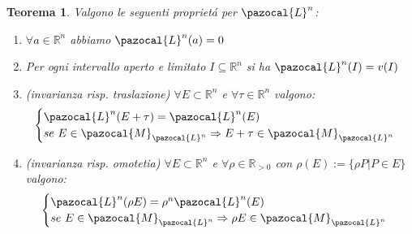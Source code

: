 \documentclass[11pt,a4paper]{report}
\theoremstyle{plain}
\newtheorem{thm}{Teorema}[chapter] %
\theoremstyle{definition}
\newcommand{\Le}{\pazocal{L}}
\newcommand{\Ml}{\pazocal{M}_{\Le^n}}
\begin{document}
\begin{thm}
	Valgono le seguenti propriet\'a per $\Le^n$:
	\begin{enumerate}
		\item $\forall a \in \mathbb{R}^n$ abbiamo $\Le^n(a) = 0$
		\item Per ogni intervallo aperto e limitato $I \subseteq \mathbb{R}^n$ si ha  $\Le^n(I) = v(I)$
		\item (invarianza risp. traslazione) $\forall E \subset \mathbb{R}^n$ e $\forall \tau \in \mathbb{R}^n$ valgono:
		\[
			\begin{cases}
				\Le^n(E+\tau) = \Le^n(E)\\
				se\ E \in \Ml \Rightarrow E+\tau \in \Ml
			\end{cases}		
		\]
		\item (invarianza risp. omotetia) $\forall E \subset \mathbb{R}^n$ e $\forall \rho \in \mathbb{R}_{>0}$ con $\rho(E) := \{\rho P | P \in E\}$ valgono:
		\[
			\begin{cases}
				\Le^n(\rho E) = \rho^n\Le^n(E)\\
				se\ E \in \Ml \Rightarrow \rho E \in \Ml
			\end{cases}		
		\]
	\end{enumerate}
\end{thm}
\end{document}
